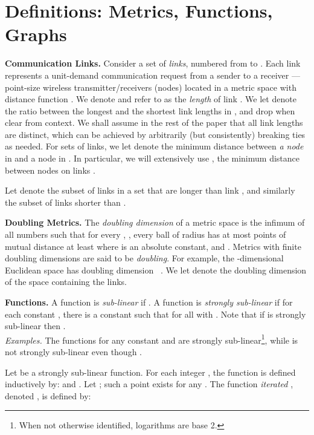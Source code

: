 \documentclass[11pt]{article}
\newcommand{\mypara}[1]{\smallskip\noindent\textbf{#1.}}  \newcommand{\tightpara}[1]{\noindent\textbf{#1.}}
\begin{document}
\section{Definitions: Metrics, Functions, Graphs}
\label{S:defs}

\mypara{Communication Links}
Consider a set  of  \emph{links}\label{G:numlinks}, numbered from  to . Each link  represents a
unit-demand communication request from a sender  to a receiver \label{G:siri} --- point-size wireless
transmitter/receivers (nodes) located in a metric space with distance function \label{G:distance}.  We denote
\label{G:asymdistance} and refer to \label{G:li} as the \emph{length} of link .
We let \label{G:delta} denote the ratio between the longest and the shortest link lengths in , and drop
 when clear from context.  We shall assume in the rest of the paper that all link lengths are distinct, which can be
achieved by arbitrarily (but consistently) breaking ties as needed.  For sets  of links, we let 
denote the minimum distance between \emph{a node} in  and a node in . In particular, we will extensively use
\label{G:symdistance}, the minimum distance between nodes on links .

Let \label{G:liplus} denote the subset of links in a set  that are longer than link ,
and similarly \label{G:liminus} the subset of links shorter than .

\mypara{Doubling Metrics} The \emph{doubling dimension} of a metric space is the infimum of all numbers 
such that for every , , every ball of radius  has at most 
points of mutual distance at least  where  is an absolute constant, and .
Metrics with finite doubling dimensions are said to be \emph{doubling}. For example, the -dimensional Euclidean space
has doubling dimension ~\cite{heinonen}.  We let \label{G:dimension} denote the doubling dimension of the space
containing the links.


\mypara{Functions}
A function  is \emph{sub-linear} if .
A function  is \emph{strongly sub-linear} if for each constant , there is a constant  such that  for all  with . Note that if  is strongly sub-linear then . 
\\\textit{Examples.} The functions  for any constant  and  are strongly
sub-linear\footnote{When not otherwise identified, logarithms are base 2.}, while  is not strongly sub-linear even though .

Let  be a strongly sub-linear function. For each integer , the function  is defined inductively by:  and \label{G:frepeated}. Let ; such a point exists for any . The function \emph{iterated }, denoted \label{G:fstar}, is defined by:
\end{document}
